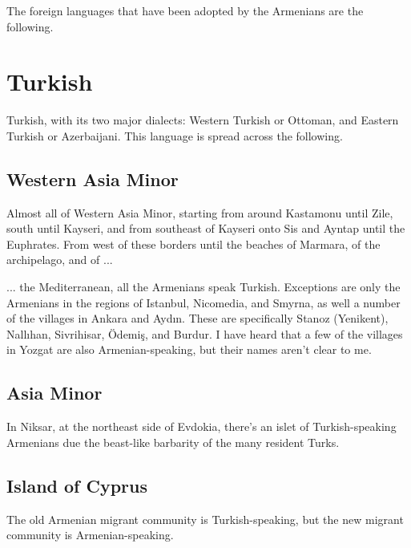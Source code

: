 The foreign languages that have been adopted by the Armenians are the following. 


\section{Turkish}

Turkish, with its two major dialects: Western Turkish or Ottoman, and Eastern Turkish or Azerbaijani. This language is spread across the following. 

\subsection{Western Asia Minor}

Almost all of Western Asia Minor, starting from around Kastamonu until Zile, south until Kayseri, and from southeast of Kayseri onto Sis and Ayntap until the Euphrates. From west of these borders until the beaches of Marmara, of the archipelago, and of ... 

\begin{adjarianpage}\label{page:31}\end{adjarianpage}%

... the Mediterranean, all the Armenians speak Turkish. Exceptions are only the Armenians in the regions of Istanbul, Nicomedia, and Smyrna, as well a number of the villages in Ankara and Aydın. These are specifically Stanoz (Yenikent), Nallıhan, Sivrihisar, Ödemiş, and Burdur. I have heard that a few of the villages in Yozgat are also Armenian-speaking, but their names aren't clear to me. 

\subsection{Asia Minor}
In Niksar, at the northeast side of Evdokia, there's an islet of Turkish-speaking Armenians due the beast-like barbarity of the many resident Turks.
\subsection{Island of Cyprus}

The old Armenian migrant community is Turkish-speaking, but the new migrant community is Armenian-speaking. 
